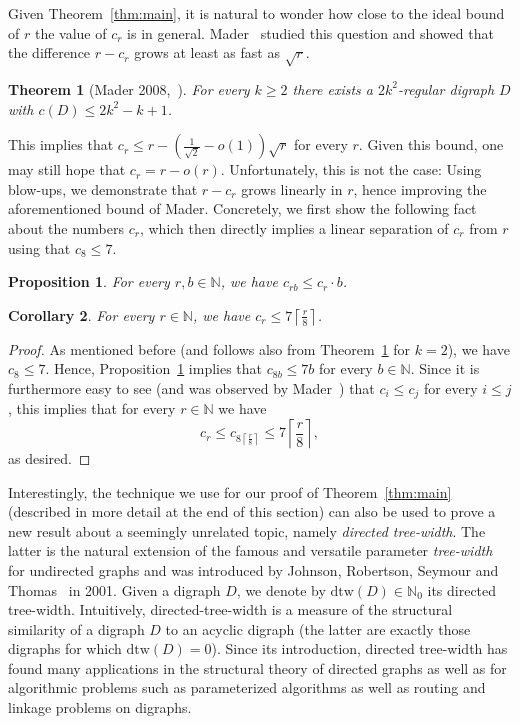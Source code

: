 \documentclass[a4paper,10pt]{article}
\newtheorem{theorem}{Theorem}
\newtheorem{corollary}[theorem]{Corollary}
\newtheorem{proposition}{Proposition}
\begin{document}
Given Theorem~\ref{thm:main}, it is natural to wonder how close to the ideal bound of $r$ the value of $c_r$ is in general. Mader~\cite{MR2588727} studied this question and showed that the difference $r-c_r$ grows at least as fast as $\sqrt{r}$.
\begin{theorem}[Mader 2008,~\cite{MR2588727}]\label{thm:maderconstruction}
For every $k\ge 2$ there exists a $2k^2$-regular digraph $D$ with $c(D)\le 2k^2-k+1$.
\end{theorem}
This implies that $c_r\le r-\left(\frac{1}{\sqrt{2}}-o(1)\right)\sqrt{r}$ for every $r$. Given this bound, one may still hope that $c_r=r-o(r)$. Unfortunately, this is not the case: Using blow-ups, we demonstrate that $r-c_r$ grows linearly in $r$, hence improving the aforementioned bound of Mader. Concretely, we first show the following fact about the numbers $c_r$, which then directly implies a linear separation of $c_r$ from $r$ using that $c_8\le 7$.
\begin{proposition}\label{prop:upper}
For every $r, b\in \mathbb{N}$, we have $c_{rb}\le c_r\cdot b$.
\end{proposition}

\begin{corollary}\label{cor:upper}
    For every $r\in \mathbb{N}$, we have $c_r\le 7\left\lceil \frac{r}{8}\right\rceil$.
\end{corollary}
\begin{proof}
As mentioned before (and follows also from Theorem~\ref{thm:maderconstruction} for $k=2$), we have $c_8\le 7$. Hence, Proposition~\ref{prop:upper} implies that $c_{8b}\le 7b$ for every $b\in \mathbb{N}$. Since it is furthermore easy to see (and was observed by Mader~\cite{MR2588727}) that $c_{i}\le c_j$ for every $i\le j$, this implies that for every $r\in \mathbb{N}$ we have
$$c_r\le c_{8\left\lceil\frac{r}{8}\right\rceil}\le 7\left\lceil \frac{r}{8}\right\rceil,$$ as desired.
\end{proof}

Interestingly, the technique we use for our proof of Theorem~\ref{thm:main} (described in more detail at the end of this section) can also be used to prove a new result about a seemingly unrelated topic, namely \emph{directed tree-width}. The latter is the natural extension of the famous and versatile parameter \emph{tree-width} for undirected graphs and was introduced by Johnson, Robertson, Seymour and Thomas~\cite{MR1828440} in 2001. Given a digraph $D$, we denote by $\mathrm{dtw}(D)\in \mathbb{N}_0$ its directed tree-width. Intuitively, directed-tree-width is a measure of the structural similarity of a digraph $D$ to an acyclic digraph (the latter are exactly those digraphs for which $\mathrm{dtw}(D)=0$). Since its introduction, directed tree-width has found many applications in the structural theory of directed graphs as well as for algorithmic problems such as parameterized algorithms as well as routing and linkage problems on digraphs. 
\end{document}
